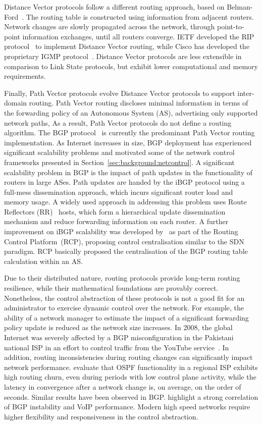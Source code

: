 Distance Vector protocols follow a different routing approach, based on
Belman-Ford~. The routing table is constructed using
information from adjacent routers. Network changes are slowly propagated across
the network, through point-to-point information exchanges, until all routers
converge.  IETF developed the RIP  protocol~ to implement Distance
Vector routing, while Cisco has developed the proprietary IGMP
protocol~. Distance Vector protocols are less extensible in
comparison to Link State protocols, but exhibit lower computational and memory
requirements.

Finally, Path Vector protocols evolve Distance Vector protocols to support
inter-domain routing. Path Vector routing discloses minimal information in
terms of the forwarding policy of an Autonomous System (AS), advertising only
supported network paths, As a result, Path Vector protocols do not define a
routing algorithm.  The BGP protocol~ is currently the
predominant Path Vector routing implementation.  As Internet increases in size,
BGP deployment has experienced significant scalability problems and motivated
some of the network control frameworks presented in
Section~\ref{sec:background:netcontrol}.  A significant scalability problem in
BGP is the impact of path updates in the functionality of routers in large
ASes. Path updates are handed by the iBGP protocol using a full-mess
dissemination approach, which incurs significant router load and memory usage.
A widely used approach in addressing this problem uses Route Reflectors
(RR)~ hosts, which form a hierarchical update dissemination
mechanism and reduce forwarding information on each router. A further
improvement on iBGP scalability was developed by~ as part of
the Routing Control Platform~(RCP), proposing control centralisation similar to
the SDN paradigm. RCP basically proposed the centralisation of the BGP routing
table calculation within an AS.

Due to their distributed nature, routing protocols provide long-term routing
resilience, while their mathematical foundations are provably correct.
Nonetheless, the control abstraction of these protocols is not a good fit for
an administrator to exercise dynamic control over the network. For example, the
ability of a network manager to estimate the impact of a significant forwarding
policy update is reduced as the network size increases.  In 2008, the global
Internet was severely affected by a BGP misconfiguration in the Pakistani
national ISP in an effort to control traffic from the YouTube
service~.  In addition, routing inconsistencies during
routing changes can significantly impact network performance.
 evaluate that OSPF functionality in a regional ISP exhibits
high routing churn, even during periods with low control plane activity, while
the latency in convergence after a network change is, on average, on the order of
seconds. Similar results have been observed in BGP\@.  
highlight a strong correlation of BGP instability and VoIP
performance. Modern high speed networks require higher flexibility and
responsiveness in the control abstraction. 

